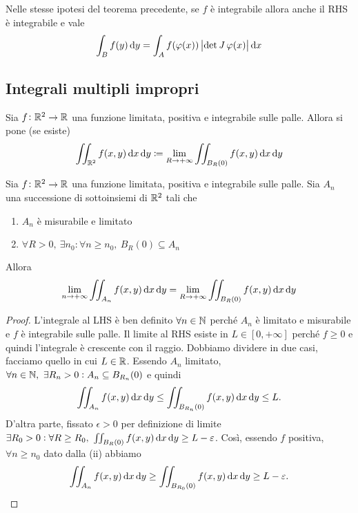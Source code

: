 \begin{corollary}
	Nelle stesse ipotesi del teorema precedente, se $ f $ è integrabile allora anche il RHS è integrabile e vale 
	\begin{equation}
	\int_{B} f(y) \dif{y} = \int_{A} f(\varphi(x)) \, \abs{\det{\jac{\varphi}(x)}} \dif{x}
	\end{equation}
\end{corollary}

\subsection{Integrali multipli impropri}

\begin{definition}
	Sia $ f \colon \mathbb{R}^2 \to \mathbb{R} $ una funzione limitata, positiva e integrabile sulle palle. Allora si pone (se esiste)
	\begin{equation}
		\iint_{\R^2} f(x, y) \dif{x} \dif{y} \coloneqq \lim_{R \to +\infty} \iint_{B_R(0)} f(x, y) \dif{x} \dif{y}
	\end{equation}
\end{definition}

\begin{prop}
	Sia $ f \colon \mathbb{R}^2 \to \mathbb{R} $ una funzione limitata, positiva e integrabile sulle palle. Sia $ A_n $ una successione di sottoinsiemi di $ \mathbb{R}^2 $ tali che
	\begin{enumerate}[label = (\roman*)]
		\item $ A_n $ è misurabile e limitato
		\item $ \forall R > 0, \ \exists n_0 : \forall n \geq n_0, \ B_{R}(0) \subseteq A_n $
	\end{enumerate}
	Allora 
	\begin{equation*}
		\lim_{n \to +\infty} \iint_{A_n} f(x, y) \dif{x} \dif{y} = \lim_{R \to +\infty} \iint_{B_R(0)} f(x, y) \dif{x} \dif{y}
	\end{equation*}
\end{prop}
%
\begin{proof}
	L'integrale al LHS è ben definito $ \forall n \in \mathbb{N} $ perché $ A_n $ è limitato e misurabile e $ f $ è integrabile sulle palle. Il limite al RHS esiste in $ L \in [0, +\infty] $ perché $ f \geq 0 $ e quindi l'integrale è crescente con il raggio. Dobbiamo dividere in due casi, facciamo quello in cui $ L \in \mathbb{R} $. Essendo $ A_n $ limitato, $ \forall n \in \mathbb{N}, \ \exists R_n > 0 : A_n \subseteq B_{R_n}(0) $ e quindi 
	\[
		\iint_{A_n} f(x, y) \dif{x} \dif{y} \leq \iint_{B_{R_n}(0)} f(x, y) \dif{x} \dif{y} \leq L.
	\]
	D'altra parte, fissato $ \epsilon > 0 $ per definizione di limite $ \exists R_0 > 0 : \forall R \geq R_0, \ \iint_{B_R(0)} f(x, y) \dif{x} \dif{y} \geq L - \epsilon $. Così, essendo $ f $ positiva, $ \forall n \geq n_0 $ dato dalla (ii) abbiamo
	\[
		\iint_{A_n} f(x, y) \dif{x} \dif{y} \geq \iint_{B_{R_0}(0)} f(x, y) \dif{x} \dif{y} \geq L - \epsilon. \qedhere
	\]
\end{proof}

